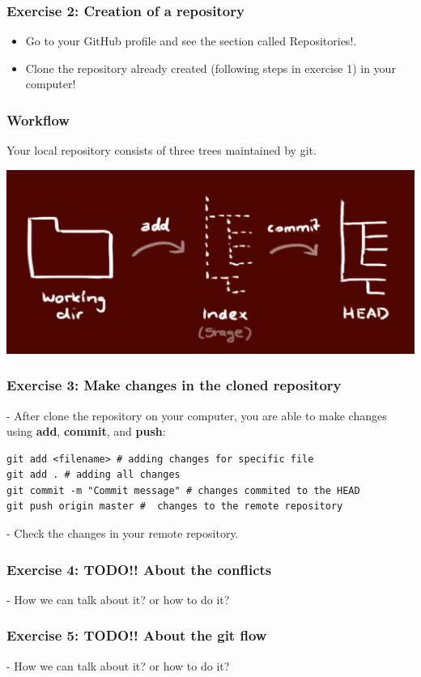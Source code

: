 \documentclass[svgnames]{beamer}
\begin{document}
\begin{frame}
\frametitle{Exercise 2: Creation of a repository}

\begin{itemize}
     \item Go to your GitHub profile and see the section called Repositories!.
    \item Clone the repository already created (following steps in exercise 1) in your computer!
\end{itemize}
\end{frame}

\begin{frame}[fragile]
\frametitle{Workflow}

Your local repository consists of three trees maintained by git.

\vspace{1em}
\begin{center}
\includegraphics[scale=0.25]{img/workflow.png}
\end{center}
\end{frame}


\begin{frame}[fragile]
\frametitle{Exercise 3: Make changes in the cloned repository}

- After clone the repository on your computer, you are able to make changes using \textbf{add}, \textbf{commit}, and \textbf{push}:

\begin{lstlisting}
git add <filename> # adding changes for specific file
git add . # adding all changes
git commit -m "Commit message" # changes commited to the HEAD
git push origin master #  changes to the remote repository
\end{lstlisting}

- Check the changes in your remote repository.

\end{frame}

\begin{frame}[fragile]
\frametitle{Exercise 4: TODO!! About the conflicts }

- How we can talk about it? or how to do it? 

\end{frame}

\begin{frame}[fragile]
\frametitle{Exercise 5: TODO!! About the git flow}

- How we can talk about it? or how to do it? 

\end{frame}
\end{document}

